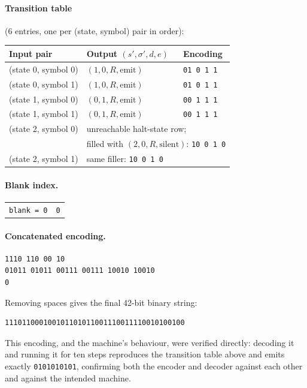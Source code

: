 \documentclass[11pt]{article}
\begin{document}
\paragraph{Transition table} (6 entries, one per (state, symbol) pair in order):
\begin{center}
\begin{tabular}{lll}
  \toprule
  Input pair & Output $(s', \sigma', d, e)$ & Encoding \\
  \midrule
  (state 0, symbol 0) & $(1, 0, R, \text{emit})$ & \texttt{01 0 1 1} \\
  (state 0, symbol 1) & $(1, 0, R, \text{emit})$ & \texttt{01 0 1 1} \\
  (state 1, symbol 0) & $(0, 1, R, \text{emit})$ & \texttt{00 1 1 1} \\
  (state 1, symbol 1) & $(0, 1, R, \text{emit})$ & \texttt{00 1 1 1} \\
  (state 2, symbol 0) & \multicolumn{2}{l}{unreachable halt-state row;} \\
                       & \multicolumn{2}{l}{filled with $(2,0,R,\text{silent})$: \texttt{10 0 1 0}} \\
  (state 2, symbol 1) & \multicolumn{2}{l}{same filler: \texttt{10 0 1 0}} \\
  \bottomrule
\end{tabular}
\end{center}

\paragraph{Blank index.}
\begin{center}
\begin{tabular}{ll}
  \texttt{blank = 0} & \texttt{0} \\
\end{tabular}
\end{center}

\paragraph{Concatenated encoding.}
\begin{verbatim}
1110 110 00 10
01011 01011 00111 00111 10010 10010
0
\end{verbatim}
Removing spaces gives the final 42-bit binary string:
\begin{verbatim}
111011000100101101011001110011110010100100
\end{verbatim}
This encoding, and the machine's behaviour, were verified directly: decoding it and
running it for ten steps reproduces the transition table above and emits exactly
\texttt{0101010101}, confirming both the encoder and decoder against each other and
against the intended machine.
\end{document}
